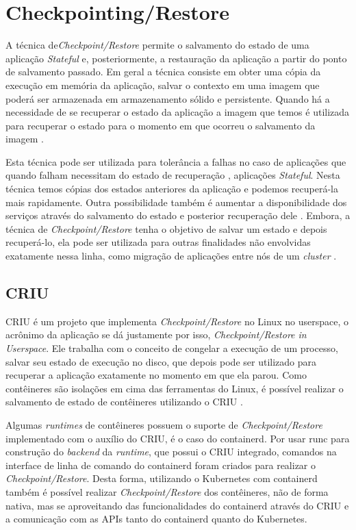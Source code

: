 \section{Checkpointing/Restore}

A técnica de\textit{Checkpoint/Restore} permite o salvamento do estado de
uma aplicação \textit{Stateful} e, posteriormente, a restauração da
aplicação a partir do ponto de salvamento passado. Em geral a técnica
consiste em obter uma cópia da execução em memória da aplicação, salvar o
contexto em uma imagem que poderá ser armazenada em armazenamento sólido e
persistente. Quando há a necessidade de se recuperar o estado da aplicação
a imagem que temos é utilizada para recuperar o estado para o momento em
que ocorreu o salvamento da imagem \cite{laadan2010linux}.

Esta técnica pode ser utilizada para tolerância a falhas no caso de aplicações
que quando falham necessitam do estado de recuperação \cite{muller2022architecture}
\cite{Chen2015/10}, aplicações \textit{Stateful}. Nesta técnica temos cópias
dos estados anteriores da aplicação e podemos recuperá-la mais rapidamente.
Outra possibilidade também é aumentar a disponibilidade dos serviços através
do salvamento do estado e posterior recuperação dele \cite{vayghan2021kubernetes}.
Embora, a técnica de \textit{Checkpoint/Restore} tenha o objetivo de salvar um
estado e depois recuperá-lo, ela pode ser utilizada para outras finalidades não
envolvidas exatamente nessa linha, como migração de aplicações entre nós de um
\textit{cluster} \cite{Chen2015/10}.

\subsection{CRIU}

CRIU é um projeto que implementa \textit{Checkpoint/Restore} no Linux no
userspace, o acrônimo da aplicação se dá justamente por isso,
\textit{Checkpoint/Restore in Userspace}. Ele trabalha com o conceito de
congelar a execução de um processo, salvar seu estado de execução no disco,
que depois pode ser utilizado para recuperar a aplicação exatamente no
momento em que ela parou. Como contêineres são isolações em cima das
ferramentas do Linux, é possível realizar o salvamento de estado de
contêineres utilizando o CRIU \cite{criu}.

Algumas \textit{runtimes} de contêineres possuem o suporte de
\textit{Checkpoint/Restore} implementado com o auxílio do CRIU, é o caso
do containerd. Por usar runc para construção do \textit{backend} da
\textit{runtime}, que possui o CRIU integrado, comandos na
interface de linha de comando do containerd foram criados para realizar o
\textit{Checkpoint/Restore}. Desta forma, utilizando o Kubernetes com
containerd também é possível realizar \textit{Checkpoint/Restore} dos
contêineres, não de forma nativa, mas se aproveitando das funcionalidades
do containerd através do CRIU e a comunicação com as APIs tanto do containerd
quanto do Kubernetes.

